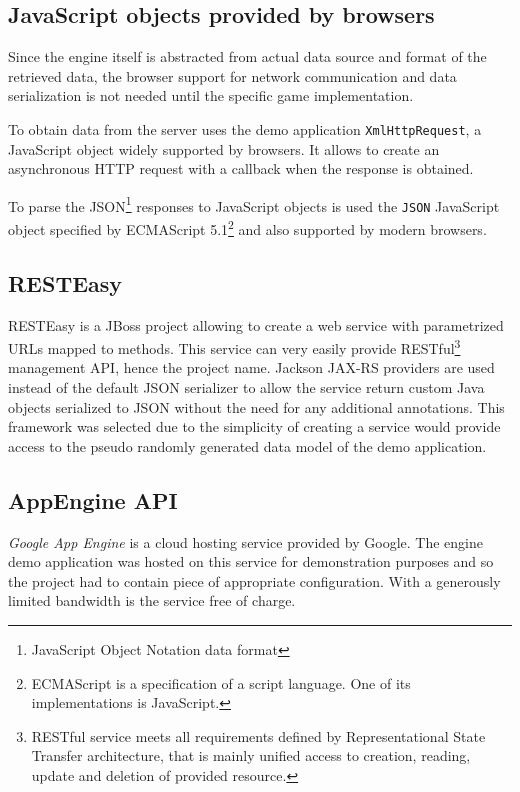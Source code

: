 \documentclass[11pt,oneside, final]{fithesis2}
\begin{document}
\subsection{JavaScript objects provided by browsers}
Since the engine itself is abstracted from actual data source and format of the retrieved data, the browser support for network communication and data serialization is not needed until the specific game implementation.

To obtain data from the server uses the demo application \texttt{XmlHttpRequest}, a JavaScript object widely supported by browsers\cite{xhr}. It allows to create an asynchronous HTTP request with a callback when the response is obtained.

To parse the JSON\footnote{JavaScript Object Notation data format} responses to JavaScript objects is used the \texttt{JSON} JavaScript object specified by ECMAScript 5.1\footnote{ECMAScript is a specification of a script language. One of its implementations is JavaScript\cite{ecma}.} and also supported by modern browsers\cite{json}.

\subsection{RESTEasy}
RESTEasy is a JBoss project allowing to create a web service with parametrized URLs mapped to methods\cite{resteasy}. This service can very easily  provide RESTful\footnote{RESTful service meets all requirements defined by Representational State Transfer architecture, that is mainly unified access to creation, reading, update and deletion of provided resource\cite{fielding}.} management API, hence the project name. Jackson JAX-RS providers\cite{jackson} are used instead of the default JSON serializer to allow the service return custom Java objects serialized to JSON without the need for any additional annotations. This framework was selected due to the simplicity of creating a service would provide access to the pseudo randomly generated data model of the demo application.

\subsection{AppEngine API}
\emph{Google App Engine} is a cloud hosting service provided by Google. The engine demo application was hosted on this service for demonstration purposes and so the project had to contain piece of appropriate configuration. With a generously limited bandwidth is the service free of charge. \cite{appengine}
\end{document}
